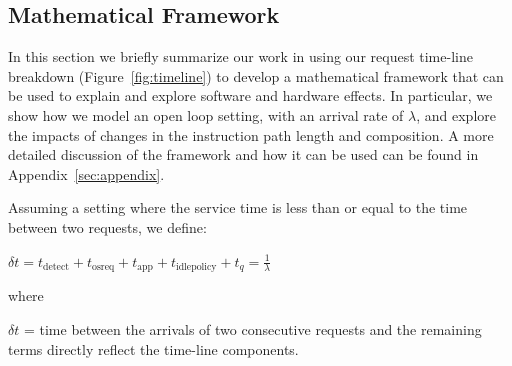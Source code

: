 \label{sec:model}


\subsection{Mathematical Framework}

In this section we briefly summarize our work in using our request time-line breakdown (Figure~\ref{fig:timeline}) to develop a mathematical framework that can be used to explain and explore software and hardware effects.  In particular, we show how we model an open loop setting, with an arrival rate of $\lambda$, and explore the impacts of changes in the instruction path length and composition.  A more detailed discussion of the framework and how it can be used can be found in Appendix~\ref{sec:appendix}.   

Assuming a setting where the service time is less than or equal to the time between two requests, we define:

$\boxed{\delta t = t_{\text{detect}} + t_{\text{osreq}} + t_{\text{app}} + t_{\text{idlepolicy}} + t_q} = \frac{1}{\lambda}$

where 

$\delta t$ = time between the arrivals of two consecutive requests and the remaining terms directly reflect the time-line components.  

